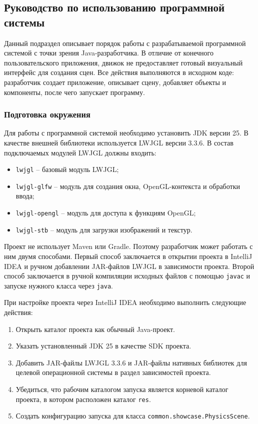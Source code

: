 \subsection{Руководство по использованию программной системы}

Данный подраздел описывает порядок работы с разрабатываемой программной системой с точки зрения Java-разработчика. В отличие от конечного пользовательского приложения, движок не предоставляет готовый визуальный интерфейс для создания сцен. Все действия выполняются в исходном коде: разработчик создает приложение, описывает сцену, добавляет объекты и компоненты, после чего запускает программу.

\subsubsection{Подготовка окружения}

Для работы с программной системой необходимо установить JDK версии 25. В качестве внешней библиотеки используется LWJGL версии 3.3.6. В состав подключаемых модулей LWJGL должны входить:
\begin{itemize}
\item \texttt{lwjgl} -- базовый модуль LWJGL;
\item \texttt{lwjgl-glfw} -- модуль для создания окна, OpenGL-контекста и обработки ввода;
\item \texttt{lwjgl-opengl} -- модуль для доступа к функциям OpenGL;
\item \texttt{lwjgl-stb} -- модуль для загрузки изображений и текстур.
\end{itemize}

Проект не использует Maven или Gradle. Поэтому разработчик может работать с ним двумя способами. Первый способ заключается в открытии проекта в IntelliJ IDEA и ручном добавлении JAR-файлов LWJGL в зависимости проекта. Второй способ заключается в ручной компиляции исходных файлов с помощью \texttt{javac} и запуске нужного класса через \texttt{java}.

При настройке проекта через IntelliJ IDEA необходимо выполнить следующие действия:
\begin{enumerate}
\item Открыть каталог проекта как обычный Java-проект.
\item Указать установленный JDK 25 в качестве SDK проекта.
\item Добавить JAR-файлы LWJGL 3.3.6 и JAR-файлы нативных библиотек для целевой операционной системы в раздел зависимостей проекта.
\item Убедиться, что рабочим каталогом запуска является корневой каталог проекта, в котором расположен каталог \texttt{res}.
\item Создать конфигурацию запуска для класса \texttt{common.showcase.PhysicsScene}.
\end{enumerate}

